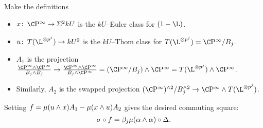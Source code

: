 \begin{lemma}
Make the definitions
\begin{itemize}
\item $x\co \CP^\infty \to \Susp^2 kU$ is the $kU$--Euler class for $(1 - \L)$.
\item $u\co T(\L^{\otimes p^j}) \to kU^2$ is the $kU$--Thom class for $T(\L^{\otimes p^j}) = \CP^\infty / B_j$.
\item $A_1$ is the projection $\frac{\CP^\infty \sm \CP^\infty}{B_j \sm B_j} \to \frac{\CP^\infty \sm \CP^\infty}{B_j \sm \CP^\infty} = (\CP^\infty / B_j) \sm \CP^\infty = T(\L^{\otimes p^j}) \sm \CP^\infty$.
\item Similarly, $A_2$ is the swapped projection $(\CP^\infty)^{\sm 2} / B_j^{\sm 2} \to \CP^\infty \sm T(\L^{\otimes p^j})$.
\end{itemize}
Setting $f = \mu(u \wedge x) A_1 - \mu(x \wedge u) A_2$ gives the desired commuting square: \[\sigma \circ f = \beta_j \mu(\alpha \wedge \alpha) \circ \Delta.\]
\end{lemma}
